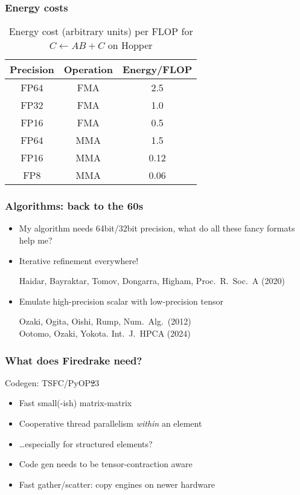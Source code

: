 \documentclass[aspectratio=169]{beamer}
\begin{document}
\begin{frame}
  \frametitle{Energy costs}
  \begin{table}
    \centering
    \begin{tabular}{ccc}
      \toprule
      Precision & Operation & Energy/FLOP \\
      \midrule
      FP64 & FMA & 2.5 \\
      FP32 & FMA & 1.0 \\
      FP16 & FMA & 0.5 \\
      FP64 & MMA & 1.5 \\
      FP16 & MMA & 0.12 \\
      FP8 & MMA & 0.06 \\
      \bottomrule
    \end{tabular}
    \caption{Energy cost (arbitrary units) per FLOP for $C \gets A B + C$
      on Hopper}
  \end{table}
\end{frame}

\begin{frame}
  \frametitle{Algorithms: back to the 60s}
  \begin{itemize}
  \item My algorithm needs 64bit/32bit precision, what do all these fancy
    formats help me?
  \item Iterative refinement everywhere!\\
    {\scriptsize
      \raggedleft
      Haidar, Bayraktar, Tomov, Dongarra, Higham, Proc.~R.~Soc.~A
      (2020) \nocite{Haidar:2020}
      \par}
  \item Emulate high-precision scalar with low-precision tensor\\
    {\scriptsize
      \raggedleft
      Ozaki, Ogita, Oishi, Rump, Num.~Alg.~(2012) \nocite{Ozaki:2012}\\
      Ootomo, Ozaki, Yokota. Int.~J.~HPCA (2024) \nocite{Ootomo:2024}
      \par}
  \end{itemize}
\end{frame}


\begin{frame}
  \frametitle{What does Firedrake need?}
  \begin{block}{Codegen: TSFC/PyOP\st{2}3}
    \begin{itemize}
    \item Fast small(-ish) matrix-matrix
    \item Cooperative thread parallelism \emph{within} an element
    \item \dots especially for structured elements?
    \item Code gen needs to be tensor-contraction aware
    \item Fast gather/scatter: copy engines on newer hardware
    \end{itemize}
  \end{block}
\end{frame}
\end{document}
